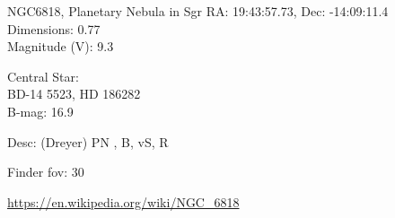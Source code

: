 \begin{block}{NGC6818, Planetary Nebula in Sgr}
    RA: 19:43:57.73, Dec: -14:09:11.4 \\ 
    Dimensions: 0.77 \\ 
    Magnitude (V): 9.3

    Central Star: \\ 
      \hspace{1em}BD-14 5523, HD 186282 \\ 
      \hspace{1em}B-mag: 16.9 

    Desc: (Dreyer) PN , B, vS, R 

    Finder fov: 30 

    \url{https://en.wikipedia.org/wiki/NGC_6818} 
\end{block}